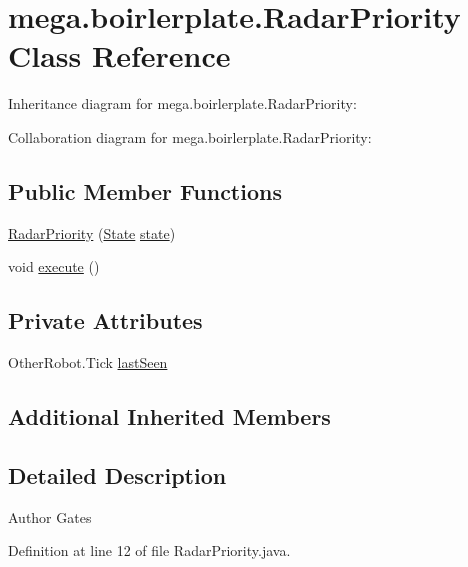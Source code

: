\hypertarget{classmega_1_1boirlerplate_1_1_radar_priority}{}\section{mega.\+boirlerplate.\+Radar\+Priority Class Reference}
\label{classmega_1_1boirlerplate_1_1_radar_priority}


Inheritance diagram for mega.\+boirlerplate.\+Radar\+Priority\+:


Collaboration diagram for mega.\+boirlerplate.\+Radar\+Priority\+:
\subsection*{Public Member Functions}
\begin{DoxyCompactItemize}
\item 
\hyperlink{classmega_1_1boirlerplate_1_1_radar_priority_ad73faa5f90ef3960fe220047448da9a2}{Radar\+Priority} (\hyperlink{classmega_1_1boirlerplate_1_1_state}{State} \hyperlink{classmega_1_1boirlerplate_1_1_component_a87b0d70f323b5fee60a200e07c9c20fd}{state})
\item 
void \hyperlink{classmega_1_1boirlerplate_1_1_radar_priority_a7a90d23b88758a08734ae7af560f48bd}{execute} ()
\end{DoxyCompactItemize}
\subsection*{Private Attributes}
\begin{DoxyCompactItemize}
\item 
Other\+Robot.\+Tick \hyperlink{classmega_1_1boirlerplate_1_1_radar_priority_aaec1525e375033dcfb5adc83457c76e6}{last\+Seen}
\end{DoxyCompactItemize}
\subsection*{Additional Inherited Members}


\subsection{Detailed Description}
\begin{DoxyAuthor}{Author}
Gates 
\end{DoxyAuthor}


Definition at line 12 of file Radar\+Priority.\+java.




